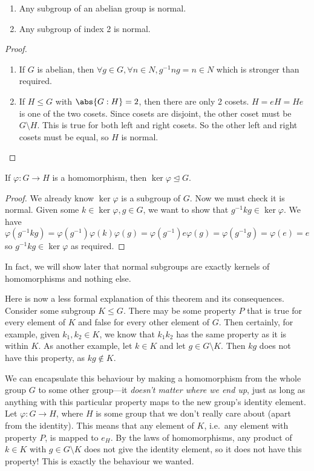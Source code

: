 \begin{proposition}
	\begin{enumerate}
		\item Any subgroup of an abelian group is normal.
		\item Any subgroup of index 2 is normal.
	\end{enumerate}
\end{proposition}
\begin{proof}
	\begin{enumerate}
		\item If \(G\) is abelian, then \(\forall g \in G, \forall n \in N, g^{-1}ng = n \in N\) which is stronger than required.
		\item If \(H \leq G\) with \(\abs{G : H} = 2\), then there are only 2 cosets.
		      \(H = eH = He\) is one of the two cosets.
		      Since cosets are disjoint, the other coset must be \(G \setminus H\).
		      This is true for both left and right cosets.
		      So the other left and right cosets must be equal, so \(H\) is normal.
	\end{enumerate}
\end{proof}

\begin{proposition}
	If \(\varphi: G \to H\) is a homomorphism, then \(\ker \varphi \trianglelefteq G\).
\end{proposition}
\begin{proof}
	We already know \(\ker \varphi\) is a subgroup of \(G\).
	Now we must check it is normal.
	Given some \(k \in \ker \varphi, g \in G\), we want to show that \(g^{-1} k g \in \ker \varphi\).
	We have \(\varphi(g^{-1} k g) = \varphi(g^{-1}) \varphi(k) \varphi(g) = \varphi(g^{-1}) e \varphi(g) = \varphi(g^{-1}g) = \varphi(e) = e\) so \(g^{-1} k g \in \ker \varphi\) as required.
\end{proof}
In fact, we will show later that normal subgroups are exactly kernels of homomorphisms and nothing else.

Here is now a less formal explanation of this theorem and its consequences.
Consider some subgroup \(K \leq G\).
There may be some property \(P\) that is true for every element of \(K\) and false for every other element of \(G\).
Then certainly, for example, given \(k_1, k_2 \in K\), we know that \(k_1k_2\) has the same property as it is within \(K\).
As another example, let \(k \in K\) and let \(g \in G \setminus K\).
Then \(kg\) does not have this property, as \(kg \notin K\).

We can encapsulate this behaviour by making a homomorphism from the whole group \(G\) to some other group---it \textit{doesn't matter where we end up}, just as long as anything with this particular property maps to the new group's identity element.
Let \(\varphi: G \to H\), where \(H\) is some group that we don't really care about (apart from the identity).
This means that any element of \(K\), i.e.\ any element with property \(P\), is mapped to \(e_H\).
By the laws of homomorphisms, any product of \(k \in K\) with \(g \in G \setminus K\) does not give the identity element, so it does not have this property!
This is exactly the behaviour we wanted.

